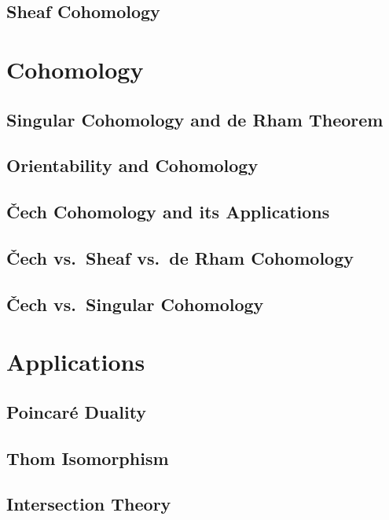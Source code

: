 \documentclass[english,letterpaper]{article}%
\numberwithin{equation}{section}
\numberwithin{figure}{section}
\numberwithin{table}{section}
\theoremstyle{definition}
\theoremstyle{definition}
\theoremstyle{definition}
\theoremstyle{plain}
\theoremstyle{plain}
\theoremstyle{plain}
\theoremstyle{plain}
\theoremstyle{remark}
\theoremstyle{remark}
\begin{document}
\subsection{Sheaf Cohomology}




\section{Cohomology}
\subsection{Singular Cohomology and de Rham Theorem}

\subsection{Orientability and Cohomology}

\subsection{\v Cech Cohomology and its Applications}

\subsection{\v Cech  vs.\ Sheaf vs.\ de Rham Cohomology}

\subsection{\v Cech vs.\ Singular Cohomology}




\section{Applications}

\subsection{Poincar\'e Duality}

\subsection{Thom Isomorphism}

\subsection{Intersection Theory}
\end{document}
